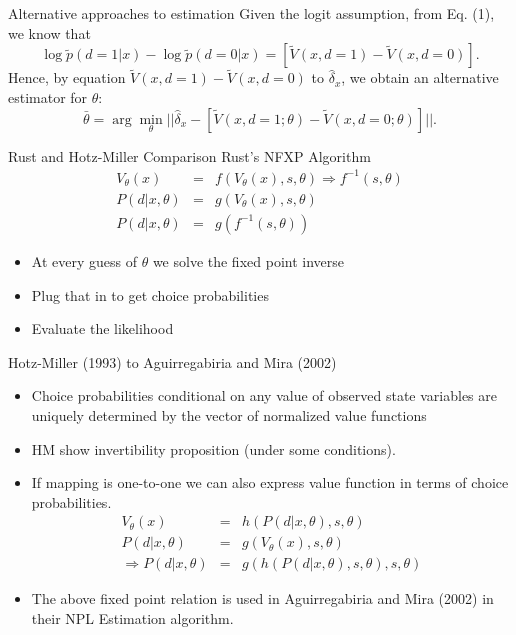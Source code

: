 \documentclass[xcolor=pdftex,dvipsnames,table,mathserif]{beamer}
\begin{document}
\begin{frame}{Alternative approaches to estimation}
Given the logit assumption, from Eq. (1), we know that
\begin{equation*}
\log \tilde p (d=1 |x) - \log \tilde p (d =0 |x) = \left [ \tilde V (x, d =1 ) - \tilde V (x, d = 0) \right ] .
\end{equation*}
Hence, by equation $\tilde V (x, d = 1) - \tilde V (x, d =0)$ to $\hat \delta_x$, we obtain an alternative estimator for $\theta$:
\begin{equation*}
\bar \theta = \arg \min_\theta || \hat \delta_x - \left [ \tilde V (x, d =1; \theta) - \tilde V (x, d = 0 ;\theta) \right ] ||.
\end{equation*}
\end{frame}

\begin{frame}{Rust and Hotz-Miller Comparison}
Rust's NFXP Algorithm
\begin{eqnarray*}
V_{\theta}(x) &=& f(V_{\theta}(x),s,\theta) \Rightarrow  f^{-1}(s,\theta)  \\
P(d | x,\theta) &=& g(V_{\theta}(x),s,\theta) \\
P(d | x,\theta) &=& g(f^{-1}(s,\theta)) 
\end{eqnarray*}
\begin{itemize}
\item At every guess of $\theta$ we solve the fixed point inverse
\item Plug that in to get choice probabilities
\item Evaluate the likelihood
\end{itemize}
\end{frame}


\begin{frame}{Hotz-Miller (1993) to Aguirregabiria and Mira (2002)}
\begin{itemize}
\item Choice probabilities conditional on any value of observed state variables are uniquely determined by the vector of normalized value functions
\item HM show invertibility proposition (under some conditions).
\item If mapping is one-to-one we can also express value function in terms of choice probabilities. 
\begin{eqnarray*}
V_{\theta}(x) &=& h(P(d | x,\theta),s,\theta)\\
P(d | x,\theta) &=& g(V_{\theta}(x),s,\theta) \\
\Rightarrow P(d | x,\theta) &=& g(h(P(d | x, \theta),s ,\theta),s,\theta)
\end{eqnarray*}
\item The above fixed point relation is used in Aguirregabiria and Mira (2002) in their NPL Estimation algorithm.
\end{itemize}
\end{frame}
\end{document}
